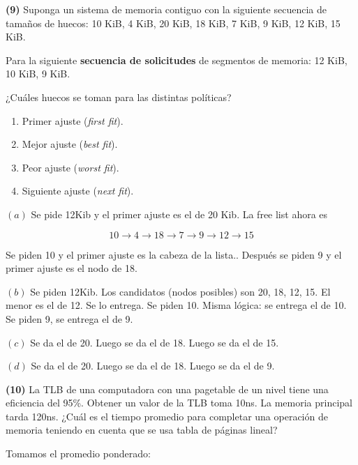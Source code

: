 \documentclass[12pt]{article}
\theoremstyle{definition}
\begin{document}
\pagebreak 


\begin{shaded}
\textbf{(9)} Suponga un sistema de memoria contiguo con la siguiente secuencia de tamaños de huecos:
10 KiB, 4 KiB, 20 KiB, 18 KiB, 7 KiB, 9 KiB, 12 KiB, 15 KiB.

Para la siguiente \textbf{secuencia de solicitudes} de segmentos de memoria:
12 KiB, 10 KiB, 9 KiB.

¿Cuáles huecos se toman para las distintas políticas?

\begin{enumerate}[label=(\alph*)]
\item Primer ajuste (\textit{first fit}).
\item Mejor ajuste (\textit{best fit}).
\item Peor ajuste (\textit{worst fit}).
\item Siguiente ajuste (\textit{next fit}).
\end{enumerate}

\end{shaded}

$(a)$ Se pide 12Kib y el primer ajuste es el de 20 Kib. La free list ahora es 

\begin{equation*}
    10 \to 4 \to 18 \to 7 \to 9 \to 12 \to 15
\end{equation*}

Se piden 10 y el primer ajuste es la cabeza de la lista.. Después se piden 9 y
el primer ajuste es el nodo de 18.

$(b)$ Se piden 12Kib. Los candidatos (nodos posibles) son 20, 18, 12, 15. El
menor es el de 12.  Se lo entrega. Se piden 10. Misma lógica: se entrega el de 10. Se piden 9, se entrega el de 9.

$(c)$ Se da el de 20. Luego se da el de 18. Luego se da el de 15.

$(d)$ Se da el de 20. Luego se da el de 18. Luego se da el de 9.

\pagebreak 

\begin{shaded}
    \textbf{(10)}  La TLB de una computadora con una pagetable de un nivel tiene
    una eficiencia del 95\%. Obtener un valor de la TLB toma 10ns. La memoria
    principal tarda 120ns. ¿Cuál es el tiempo promedio para completar una
    operación de memoria teniendo en cuenta que se usa tabla de páginas
    lineal?
\end{shaded}

Tomamos el promedio ponderado:
\end{document}
